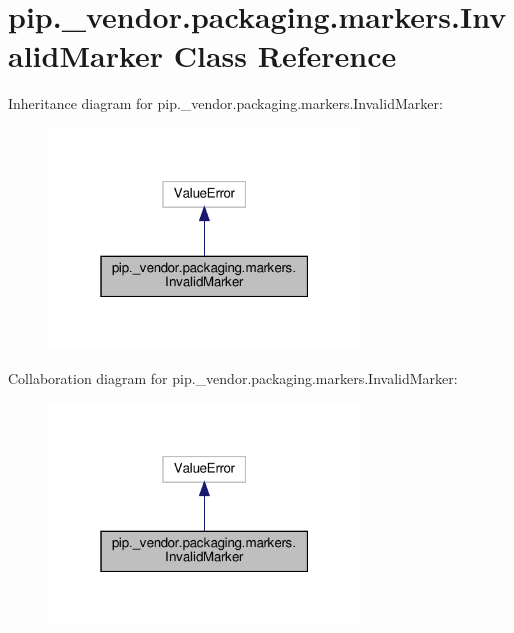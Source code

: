 \hypertarget{classpip_1_1__vendor_1_1packaging_1_1markers_1_1InvalidMarker}{}\section{pip.\+\_\+vendor.\+packaging.\+markers.\+Invalid\+Marker Class Reference}
\label{classpip_1_1__vendor_1_1packaging_1_1markers_1_1InvalidMarker}


Inheritance diagram for pip.\+\_\+vendor.\+packaging.\+markers.\+Invalid\+Marker\+:
\nopagebreak
\begin{figure}[H]
\begin{center}
\leavevmode
\includegraphics[width=235pt]{classpip_1_1__vendor_1_1packaging_1_1markers_1_1InvalidMarker__inherit__graph}
\end{center}
\end{figure}


Collaboration diagram for pip.\+\_\+vendor.\+packaging.\+markers.\+Invalid\+Marker\+:
\nopagebreak
\begin{figure}[H]
\begin{center}
\leavevmode
\includegraphics[width=235pt]{classpip_1_1__vendor_1_1packaging_1_1markers_1_1InvalidMarker__coll__graph}
\end{center}
\end{figure}


